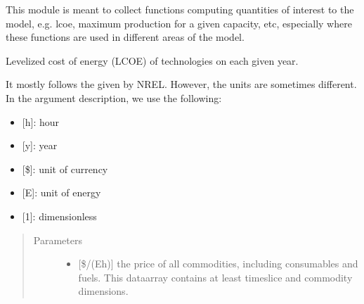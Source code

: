 \documentclass[letterpaper,10pt,english]{sphinxmanual}
\begin{document}
This module is meant to collect functions computing quantities of interest to the model,
e.g. lcoe, maximum production for a given capacity, etc, especially where these
functions are used in different areas of the model.

\begin{fulllineitems}
\label{\detokenize{api:muse.quantities.annual_levelized_cost_of_energy}}
Levelized cost of energy (LCOE) of technologies on each given year.

It mostly follows the  given by NREL. However, the
units are sometimes different. In the argument description, we use the following:
\begin{itemize}
\item {} 
{[}h{]}: hour

\item {} 
{[}y{]}: year

\item {} 
{[}\${]}: unit of currency

\item {} 
{[}E{]}: unit of energy

\item {} 
{[}1{]}: dimensionless

\end{itemize}
\begin{quote}\begin{description}
\item[{Parameters}] \leavevmode\begin{itemize}
\item {} 
 \textendash{} {[}\$/(Eh){]} the price of all commodities, including consumables and fuels.
This dataarray contains at least timeslice and commodity dimensions.


\end{itemize}
\end{description}
\end{quote}
\end{fulllineitems}
\end{document}
